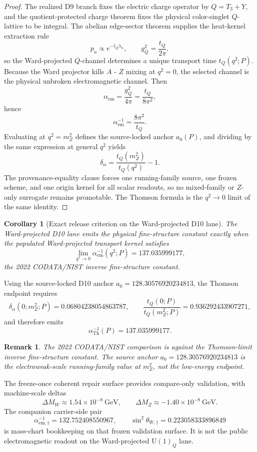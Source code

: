 \documentclass[11pt]{article}
\newtheorem{corollary}[theorem]{Corollary}
\newtheorem{remark}[theorem]{Remark}
\newcommand{\U}{\mathrm{U}}
\begin{document}
\begin{proof}
The realized D9 branch fixes the electric charge operator by \(Q=T_3+Y\), and the
quotient-protected charge theorem fixes the physical color-singlet \(Q\)-lattice to be integral.
The abelian edge-sector theorem supplies the heat-kernel extraction rule
\[
p_n\propto e^{-t_Q\lambda_n},
\qquad
g_Q^2=\frac{t_Q}{2\pi},
\]
so the Ward-projected \(Q\)-channel determines a unique transport time \(t_Q(q^2;P)\). Because
the Ward projector kills \(A\) - \(Z\) mixing at \(q^2=0\), the selected channel is the physical
unbroken electromagnetic channel. Then
\[
\alpha_{\mathrm{em}}=\frac{g_Q^2}{4\pi}=\frac{t_Q}{8\pi^2},
\]
hence
\[
\alpha_{\mathrm{em}}^{-1}=\frac{8\pi^2}{t_Q}.
\]
Evaluating at \(q^2=m_Z^2\) defines the source-locked anchor \(a_0(P)\), and dividing by the same
expression at general \(q^2\) yields
\[
\delta_\alpha=\frac{t_Q(m_Z^2)}{t_Q(q^2)}-1.
\]
The provenance-equality clause forces one running-family source, one frozen scheme, and one origin
kernel for all scalar readouts, so no mixed-family or \(Z\)-only surrogate remains promotable. The
Thomson formula is the \(q^2\to0\) limit of the same identity.
\end{proof}

\begin{corollary}[Exact release criterion on the Ward-projected D10 lane]
The Ward-projected D10 lane emits the physical fine-structure constant exactly when the populated
Ward-projected transport kernel satisfies
\[
\lim_{q^2\to0}\alpha_{\mathrm{em}}^{-1}(q^2;P)=137.035999177,
\]
the 2022 CODATA/NIST inverse fine-structure constant.
\end{corollary}

Using the source-locked D10 anchor \(a_0=128.30576920234813\), the Thomson endpoint
requires
\[
\delta_\alpha(0;m_Z^2;P)=0.06804238054863787,
\qquad
\frac{t_Q(0;P)}{t_Q(m_Z^2;P)}=0.936292433907271,
\]
and therefore emits
\[
\alpha_{\mathrm{Th}}^{-1}(P)=137.035999177.
\]

\begin{remark}
The 2022 CODATA/NIST comparison is against the Thomson-limit inverse fine-structure constant. The
source anchor \(a_0=128.30576920234813\) is the electroweak-scale running-family value at
\(m_Z^2\), not the low-energy endpoint.
\end{remark}

The freeze-once coherent repair surface provides compare-only validation, with machine-scale deltas
\[
\Delta M_W\approx 1.54\times 10^{-8}~\mathrm{GeV},
\qquad
\Delta M_Z\approx -1.40\times 10^{-8}~\mathrm{GeV}.
\]
The companion carrier-side pair
\[
\alpha_{\mathrm{em},\dagger}^{-1}=132.752408550967,
\qquad
\sin^2\theta_{W,\dagger}=0.223058333896849
\]
is mass-chart bookkeeping on that frozen validation surface. It is not the public electromagnetic
readout on the Ward-projected \(\U(1)_Q\) lane.
\end{document}
